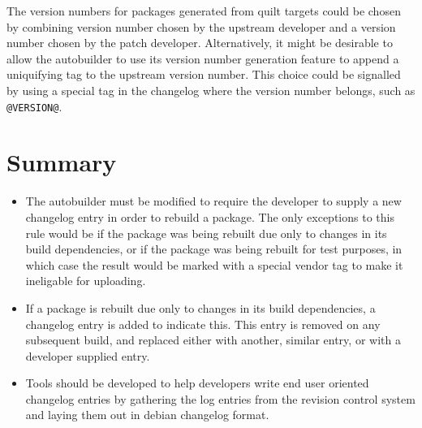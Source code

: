 \documentclass[12pt]{article}
\begin{document}
The version numbers for packages generated from quilt targets could be
chosen by combining version number chosen by the upstream developer
and a version number chosen by the patch developer.  Alternatively, it
might be desirable to allow the autobuilder to use its version number
generation feature to append a uniquifying tag to the upstream version
number.  This choice could be signalled by using a special tag in the
changelog where the version number belongs, such as {\tt @VERSION@}.

\section{Summary}

\begin{itemize}

\item The autobuilder must be modified to require the developer to
supply a new changelog entry in order to rebuild a package.  The only
exceptions to this rule would be if the package was being rebuilt due
only to changes in its build dependencies, or if the package was being
rebuilt for test purposes, in which case the result would be marked
with a special vendor tag to make it ineligable for uploading.

\item If a package is rebuilt due only to changes in its build
dependencies, a changelog entry is added to indicate this.  This entry
is removed on any subsequent build, and replaced either with another,
similar entry, or with a developer supplied entry.

\item Tools should be developed to help developers write end user
oriented changelog entries by gathering the log entries from the
revision control system and laying them out in debian changelog
format.

\end{itemize}
\end{document}
